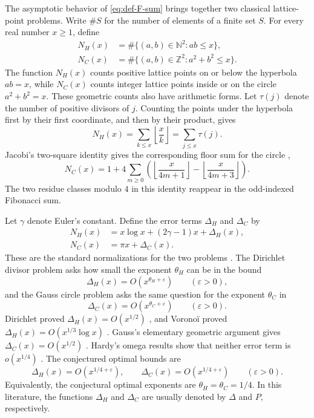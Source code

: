 \documentclass[11pt]{article}
\newcommand{\eps}{\varepsilon}
\begin{document}
The asymptotic behavior of \eqref{eq:def-F-sum} brings together two
classical lattice-point problems. Write $\#S$ for the number of elements
of a finite set $S$. For every real number $x\geq1$, define
\begin{align*}
 N_H(x)&=\#\{(a,b)\in\mathbb N^2:ab\leq x\},\\
 N_C(x)&=\#\{(a,b)\in\mathbb Z^2:a^2+b^2\leq x\}.
\end{align*}
The function $N_H(x)$ counts positive lattice points on or below the
hyperbola $ab=x$, while $N_C(x)$ counts integer lattice points inside or on
the circle $a^2+b^2=x$. These geometric counts also have arithmetic forms. Let
$\tau(j)$ denote the number of positive divisors of $j$. Counting the points
under the hyperbola first by their first coordinate, and then by their product,
gives
\[
 N_H(x)=\sum_{k\leq x}\left\lfloor\frac{x}{k}\right\rfloor
       =\sum_{j\leq x}\tau(j).
\]
Jacobi's two-square identity gives the corresponding floor sum for the circle
\cite{HardyCircle,Hirschhorn},
\[
 N_C(x)=1+4\sum_{m\geq0}
 \left(
  \left\lfloor\frac{x}{4m+1}\right\rfloor
  -\left\lfloor\frac{x}{4m+3}\right\rfloor
 \right).
\]
The two residue classes modulo $4$ in this identity reappear in the
odd-indexed Fibonacci sum.

Let $\gamma$ denote Euler's constant. Define the error terms $\Delta_H$ and
$\Delta_C$ by
\begin{align}
 N_H(x)&=x\log x+(2\gamma-1)x+\Delta_H(x),
      \label{eq:def-hyperbola}\\
 N_C(x)&=\pi x+\Delta_C(x).
      \label{eq:def-circle}
\end{align}
These are the standard normalizations for the two problems
\cite{Dirichlet,Guy,BerndtKimZaharescu}. The Dirichlet divisor problem asks
how small the exponent $\theta_H$ can be in the bound
\[
 \Delta_H(x)=O(x^{\theta_H+\eps})
 \qquad(\eps>0),
\]
and the Gauss circle problem asks the same question for the exponent
$\theta_C$ in
\[
 \Delta_C(x)=O(x^{\theta_C+\eps})
 \qquad(\eps>0).
\]
Dirichlet proved $\Delta_H(x)=O(x^{1/2})$ \cite{Dirichlet}, and Vorono\"i
proved $\Delta_H(x)=O(x^{1/3}\log x)$ \cite{Voronoi}. Gauss's elementary
geometric argument gives $\Delta_C(x)=O(x^{1/2})$
\cite{Guy,BerndtKimZaharescu}. Hardy's omega results show that neither error
term is $o(x^{1/4})$ \cite{HardyCircle,HardyDivisor}. The conjectured optimal
bounds are
\[
 \Delta_H(x)=O(x^{1/4+\eps}),\qquad
 \Delta_C(x)=O(x^{1/4+\eps})
 \qquad(\eps>0).
\]
Equivalently, the conjectural optimal exponents are
$\theta_H=\theta_C=1/4$. In this literature, the functions $\Delta_H$ and
$\Delta_C$ are usually denoted by $\Delta$ and $P$, respectively.
\end{document}
